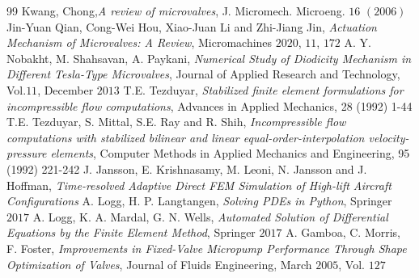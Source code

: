 \documentclass[12pt, letterpaper]{article}
\begin{document}
\pagebreak[2]
\begin{thebibliography}{99}
	Kwang, Chong,\emph{A review of microvalves}, J. Micromech. Microeng. $16$ $(2006)$
	Jin-Yuan Qian, Cong-Wei Hou, Xiao-Juan Li and Zhi-Jiang Jin, \emph{Actuation Mechanism of Microvalves: A Review}, Micromachines $2020$, $11$, $172$
	A. Y. Nobakht, M. Shahsavan, A. Paykani,
	\emph{Numerical Study of Diodicity Mechanism in Different Tesla-Type Microvalves}, Journal of Applied Research and Technology, Vol.$11$, December $2013$
	T.E. Tezduyar,
	\emph{Stabilized finite element formulations for incompressible flow computations}, Advances in Applied Mechanics, 28 (1992) 1-44
	T.E. Tezduyar, S. Mittal, S.E. Ray and R. Shih,
	\emph{Incompressible flow computations with stabilized bilinear and linear equal-order-interpolation velocity-pressure elements}, Computer Methods in Applied Mechanics and Engineering, 95 (1992) 221-242
	J. Jansson, E. Krishnasamy, M. Leoni, N. Jansson and J. Hoffman,
	\emph{Time-resolved Adaptive Direct FEM Simulation of High-lift Aircraft Configurations}
	A. Logg, H. P. Langtangen,
	\emph{Solving PDEs in Python}, Springer $2017$
	A. Logg, K. A. Mardal, G. N. Wells,
	\emph{Automated Solution of Differential Equations by the Finite Element Method}, Springer $2017$
	A. Gamboa, C. Morris, F. Foster,
	\emph{Improvements in Fixed-Valve Micropump Performance Through Shape Optimization of Valves}, Journal of Fluids Engineering, March $2005$, Vol. $127$
\end{thebibliography}
\end{document}
